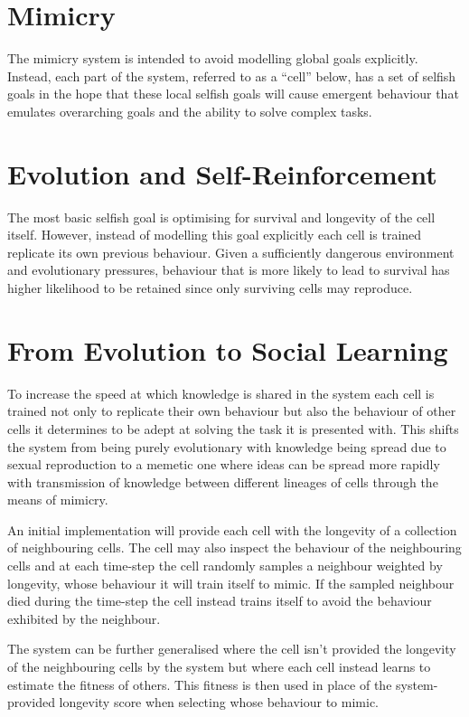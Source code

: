 \documentclass[a4paper]{article}
\begin{document}
\frenchspacing

\section{Mimicry}

The mimicry system is intended to avoid modelling global goals explicitly.
%
Instead, each part of the system, referred to as a ``cell'' below, has a set of selfish goals in the hope that these local selfish goals will cause emergent behaviour that emulates overarching goals and the ability to solve complex tasks.

\section{Evolution and Self-Reinforcement}

The most basic selfish goal is optimising for survival and longevity of the cell itself.
%
However, instead of modelling this goal explicitly each cell is trained replicate its own previous behaviour.
%
Given a sufficiently dangerous environment and evolutionary pressures, behaviour that is more likely to lead to survival has higher likelihood to be retained since only surviving cells may reproduce.

\section{From Evolution to Social Learning}

To increase the speed at which knowledge is shared in the system each cell is trained not only to replicate their own behaviour but also the behaviour of other cells it determines to be adept at solving the task it is presented with.
%
This shifts the system from being purely evolutionary with knowledge being spread due to sexual reproduction to a memetic one where ideas can be spread more rapidly with transmission of knowledge between different lineages of cells through the means of mimicry.

An initial implementation will provide each cell with the longevity of a collection of neighbouring cells.
%
The cell may also inspect the behaviour of the neighbouring cells and at each time-step the cell randomly samples a neighbour weighted by longevity, whose behaviour it will train itself to mimic.
%
If the sampled neighbour died during the time-step the cell instead trains itself to avoid the behaviour exhibited by the neighbour.

The system can be further generalised where the cell isn't provided the longevity of the neighbouring cells by the system but where each cell instead learns to estimate the fitness of others.
%
This fitness is then used in place of the system-provided longevity score when selecting whose behaviour to mimic.
\end{document}
